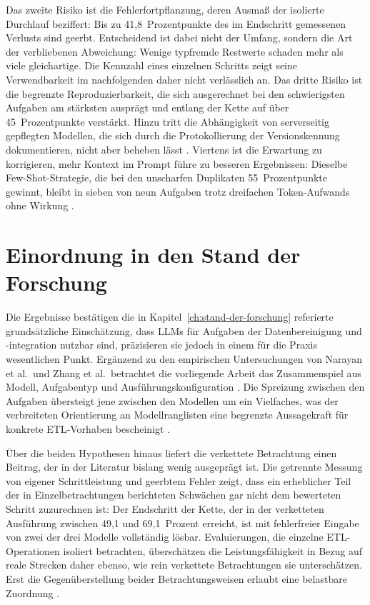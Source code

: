 Das zweite Risiko ist die Fehlerfortpflanzung, deren Ausmaß der isolierte Durchlauf beziffert: Bis zu 41,8~Prozentpunkte des im Endschritt gemessenen Verlusts sind geerbt. Entscheidend ist dabei nicht der Umfang, sondern die Art der verbliebenen Abweichung: Wenige typfremde Restwerte schaden mehr als viele gleichartige. Die Kennzahl eines einzelnen Schritts zeigt seine Verwendbarkeit im nachfolgenden daher nicht verlässlich an. Das dritte Risiko ist die begrenzte Reproduzierbarkeit, die sich ausgerechnet bei den schwierigsten Aufgaben am stärksten ausprägt und entlang der Kette auf über 45~Prozentpunkte verstärkt. Hinzu tritt die Abhängigkeit von serverseitig gepflegten Modellen, die sich durch die Protokollierung der Versionskennung dokumentieren, nicht aber beheben lässt \autocite{zhaoSurveyLargeLanguage2026,2026AIIndex}. Viertens ist die Erwartung zu korrigieren, mehr Kontext im Prompt führe zu besseren Ergebnissen: Dieselbe Few-Shot-Strategie, die bei den unscharfen Duplikaten 55~Prozentpunkte gewinnt, bleibt in sieben von neun Aufgaben trotz dreifachen Token-Aufwands ohne Wirkung \autocite{schulhoffPromptReportSystematic2025,changEfficientPromptingMethods2024}.

\section{Einordnung in den Stand der Forschung}
\label{subsec:einordnung}

Die Ergebnisse bestätigen die in Kapitel~\ref{ch:stand-der-forschung} referierte grundsätzliche Einschätzung, dass \acp{LLM} für Aufgaben der Datenbereinigung und -integration nutzbar sind, präzisieren sie jedoch in einem für die Praxis wesentlichen Punkt. Ergänzend zu den empirischen Untersuchungen von Narayan et al.\ und Zhang et al.\ betrachtet die vorliegende Arbeit das Zusammenspiel aus Modell, Aufgabentyp und Ausführungskonfiguration \autocite{narayanFoundationModelsWrangle2022,zhangJellyfish2024}. Die Spreizung zwischen den Aufgaben übersteigt jene zwischen den Modellen um ein Vielfaches, was der verbreiteten Orientierung an Modellranglisten eine begrenzte Aussagekraft für konkrete \ac{ETL}-Vorhaben bescheinigt \autocite{2026AIIndex,ComparisonAIModels}.

Über die beiden Hypothesen hinaus liefert die verkettete Betrachtung einen Beitrag, der in der Literatur bislang wenig ausgeprägt ist. Die getrennte Messung von eigener Schrittleistung und geerbtem Fehler zeigt, dass ein erheblicher Teil der in Einzelbetrachtungen berichteten Schwächen gar nicht dem bewerteten Schritt zuzurechnen ist: Der Endschritt der Kette, der in der verketteten Ausführung zwischen 49,1 und 69,1~Prozent erreicht, ist mit fehlerfreier Eingabe von zwei der drei Modelle vollständig lösbar. Evaluierungen, die einzelne \ac{ETL}-Operationen isoliert betrachten, überschätzen die Leistungsfähigkeit in Bezug auf reale Strecken daher ebenso, wie rein verkettete Betrachtungen sie unterschätzen. Erst die Gegenüberstellung beider Betrachtungsweisen erlaubt eine belastbare Zuordnung \autocite{walhaDataIntegrationTraditional2024}.

